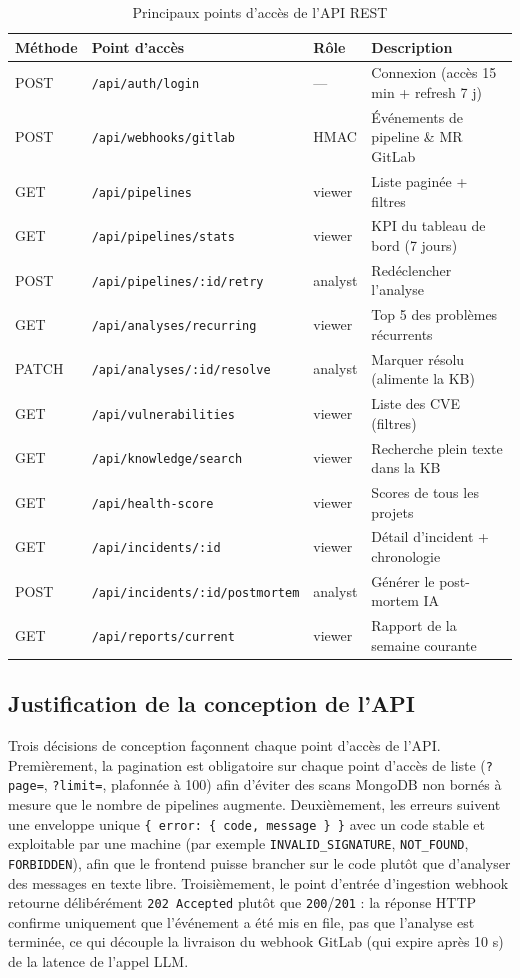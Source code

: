 \documentclass[12pt,a4paper,oneside]{report}
\begin{document}
\begin{table}[H]\centering
\caption{Principaux points d'accès de l'API REST}\label{tab:restapi}
\renewcommand{\arraystretch}{1.2}
\begin{tabularx}{\textwidth}{l p{3.6cm} >{\centering\arraybackslash}p{1.5cm} Y}
\toprule
{} Méthode & Point d'accès & Rôle & Description \\
\midrule
POST  & \texttt{/api/auth/login} & --- & Connexion (accès 15 min + refresh 7 j) \\
POST  & \texttt{/api/webhooks/gitlab} & HMAC & Événements de pipeline \& MR GitLab \\
GET   & \texttt{/api/pipelines} & viewer & Liste paginée + filtres \\
GET   & \texttt{/api/pipelines/stats} & viewer & KPI du tableau de bord (7 jours) \\
POST  & \texttt{/api/pipelines/:id/retry} & analyst & Redéclencher l'analyse \\
GET   & \texttt{/api/analyses/recurring} & viewer & Top 5 des problèmes récurrents \\
PATCH & \texttt{/api/analyses/:id/resolve} & analyst & Marquer résolu (alimente la KB) \\
GET   & \texttt{/api/vulnerabilities} & viewer & Liste des CVE (filtres) \\
GET   & \texttt{/api/knowledge/search} & viewer & Recherche plein texte dans la KB \\
GET   & \texttt{/api/health-score} & viewer & Scores de tous les projets \\
GET   & \texttt{/api/incidents/:id} & viewer & Détail d'incident + chronologie \\
POST  & \texttt{/api/incidents/:id/postmortem} & analyst & Générer le post-mortem IA \\
GET   & \texttt{/api/reports/current} & viewer & Rapport de la semaine courante \\
\bottomrule
\end{tabularx}
\end{table}

\subsection{Justification de la conception de l'API}
Trois décisions de conception façonnent chaque point d'accès de l'API. Premièrement, la pagination est obligatoire sur chaque point d'accès de liste (\texttt{?page=}, \texttt{?limit=}, plafonnée à 100) afin d'éviter des scans MongoDB non bornés à mesure que le nombre de pipelines augmente. Deuxièmement, les erreurs suivent une enveloppe unique \texttt{\{ error: \{ code, message \} \}} avec un code stable et exploitable par une machine (par exemple \texttt{INVALID\_SIGNATURE}, \texttt{NOT\_FOUND}, \texttt{FORBIDDEN}), afin que le frontend puisse brancher sur le code plutôt que d'analyser des messages en texte libre. Troisièmement, le point d'entrée d'ingestion webhook retourne délibérément \texttt{202 Accepted} plutôt que \texttt{200}/\texttt{201} : la réponse HTTP confirme uniquement que l'événement a été mis en file, pas que l'analyse est terminée, ce qui découple la livraison du webhook GitLab (qui expire après 10 s) de la latence de l'appel LLM.
\end{document}

